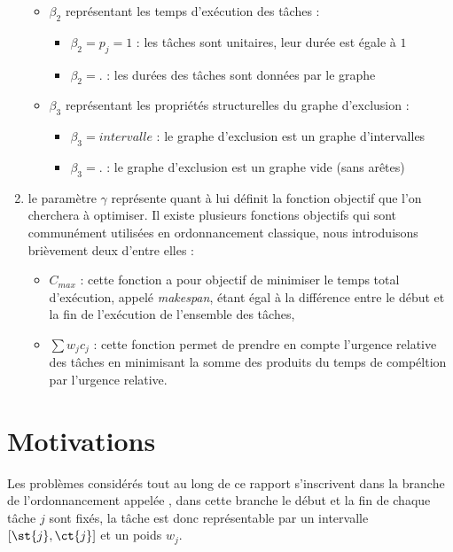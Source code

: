 \documentclass[a4paper,11pt]{report}
\begin{document}
\begin{enumerate}
\begin{itemize}[label=$\bullet$]
\begin{itemize}
                \end{itemize}
            \item $\beta_2$ représentant les temps d'exécution des tâches :
                \begin{itemize}
                    \item $\beta_2 = p_j = 1$ : les tâches sont unitaires, leur durée est égale à
                        $1$
                    \item $\beta_2 = .$ : les durées des tâches sont données par le graphe
                \end{itemize}
            \item $\beta_3$ représentant les propriétés structurelles du graphe d'exclusion :
                \begin{itemize}
                    \item \textbf{$\beta_3 = intervalle$} : le graphe d'exclusion est un graphe d'intervalles
                    \item $\beta_3 = .$ : le graphe d'exclusion est un graphe vide (sans arêtes)
                \end{itemize}
        \end{itemize}
    \item le paramètre $\gamma$ représente quant à lui définit la fonction objectif que l'on
        cherchera à optimiser. Il existe plusieurs fonctions objectifs qui sont communément
        utilisées en ordonnancement classique, nous introduisons brièvement deux d'entre elles :
        \begin{itemize}
            \item $C_{max}$ : cette fonction a pour objectif de minimiser le temps total d'exécution,
                appelé \emph{makespan}, étant égal à la différence entre le début et la fin de
                l'exécution de l'ensemble des tâches,
            \item $\sum w_j c_j$ : cette fonction permet de prendre en compte l'urgence relative des
                tâches en minimisant la somme des produits du temps de compéltion par l'urgence
                relative.
        \end{itemize}
\end{enumerate}

\section{Motivations}

Les problèmes considérés tout au long de ce rapport s'inscrivent dans la branche de l'ordonnancement
appelée \isched{}, dans cette branche le début et la fin de chaque tâche $j$ sont
fixés, la tâche est donc représentable par un intervalle $\left[ \st{j}, \ct{j} \right]$ et un poids
$w_j$. 
\end{document}
